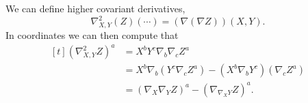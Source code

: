 \documentclass[titlepage,numbers=noenddot,oneside,%
cleardoublepage=empty,paper=a4,fontsize=11pt,%
english,%
]{scrartcl}
\begin{document}
\begin{remark}
    We can define higher covariant derivatives, \eg
    \begin{equation*}
        \nabla^2_{X,Y}(Z)(\cdots)=(\nabla(\nabla Z))(X,Y).
    \end{equation*}
    In coordinates we can then compute that
    \begin{equation*}
        \begin{aligned}[t]
            (\nabla^2_{X,Y}Z)^a&=X^b Y^c \nabla_b\nabla_c Z^a\\
            &=X^b \nabla_b (Y^c \nabla_c Z^a)-(X^b \nabla_b Y^c)(\nabla_c Z^a)\\
            &=(\nabla_X \nabla_Y Z)^a-(\nabla_{\nabla_X Y}Z)^a.
        \end{aligned}
    \end{equation*}
\end{remark}
\end{document}
